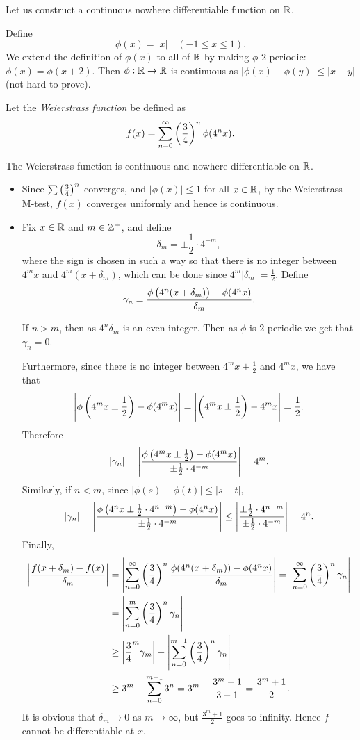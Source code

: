 \begin{example}
Let us construct a continuous nowhere differentiable function on $\mathbb R$.

Define
\[\phi(x)=|x|\quad(-1\le x\le 1).\]
We extend the definition of $\phi(x)$ to all of $\mathbb R$ by making $\phi$ $2$-periodic: $\phi(x)=\phi(x+2)$. Then $\phi:\mathbb R\to\mathbb R$ is continuous as $|\phi(x)-\phi(y)|\le|x-y|$ (not hard to prove).

Let the \emph{Weierstrass function} be defined as
\[f(x)=\sum_{n=0}^{\infty}\left(\frac{3}{4}\right)^n\phi(4^n x).\]
\begin{claim}
The Weierstrass function is continuous and nowhere differentiable on $\mathbb R$.
\end{claim}
\begin{itemize}
\item Since $\sum\left(\frac{3}{4}\right)^n$ converges, and $|\phi(x)|\le1$ for all $x\in\mathbb R$, by the Weierstrass M-test, $f(x)$ converges uniformly and hence is continuous.

\item Fix $x\in\mathbb R$ and $m\in\mathbb Z^+$, and define
\[\delta_m=\pm\frac{1}{2}\cdot 4^{-m},\]
where the sign is chosen in such a way so that there is no integer between $4^m x$ and $4^m(x+\delta_m)$, which can be done since $4^m|\delta_m|=\frac{1}{2}$. Define
\[\gamma_n=\frac{\phi\left(4^n(x+\delta_m)\right)-\phi(4^n x)}{\delta_m}.\]

If $n>m$, then as $4^n\delta_m$ is an even integer. Then as $\phi$ is $2$-periodic we get that $\gamma_n=0$. 

Furthermore, since there is no integer between $4^m x\pm\frac{1}{2}$ and $4^m x$, we have that
\[\left|\phi\left(4^m x\pm\frac{1}{2}\right)-\phi(4^m x)\right|=\left|\left(4^m x\pm\frac{1}{2}\right)-4^m x\right|=\frac{1}{2}.\]
Therefore
\[|\gamma_n|=\left|\frac{\phi\left(4^m x\pm\frac{1}{2}\right)-\phi(4^m x)}{\pm\frac{1}{2}\cdot4^{-m}}\right|=4^m.\]
Similarly, if $n<m$, since $|\phi(s)-\phi(t)|\le|s-t|$,
\[|\gamma_n|=\left|\frac{\phi\left(4^n x\pm\frac{1}{2}\cdot4^{n-m}\right)-\phi(4^n x)}{\pm\frac{1}{2}\cdot4^{-m}}\right|\le\left|\frac{\pm\frac{1}{2}\cdot4^{n-m}}{\pm\frac{1}{2}\cdot4^{-m}}\right|=4^n.\]
Finally,
\begin{align*}
\left|\frac{f(x+\delta_m)-f(x)}{\delta_m}\right|
&=\left|\sum_{n=0}^{\infty}\left(\frac{3}{4}\right)^n\frac{\phi(4^n(x+\delta_m))-\phi(4^n x)}{\delta_m}\right|=\left|\sum_{n=0}^{\infty}\left(\frac{3}{4}\right)^n\gamma_n\right|\\
&=\left|\sum_{n=0}^{m}\left(\frac{3}{4}\right)^n\gamma_n\right|\\
&\ge\left|\frac{3}{4}^m\gamma_m\right|-\left|\sum_{n=0}^{m-1}\left(\frac{3}{4}\right)^n\gamma_n\right|\\
&\ge3^m-\sum_{n=0}^{m-1}3^n=3^m-\frac{3^m-1}{3-1}=\frac{3^m+1}{2}.
\end{align*}
It is obvious that $\delta_m\to0$ as $m\to\infty$, but $\frac{3^m+1}{2}$ goes to infinity. Hence $f$ cannot be differentiable at $x$.
\end{itemize}
\end{example}
\pagebreak


